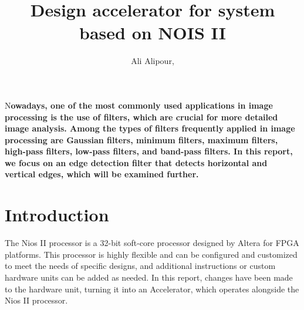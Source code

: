 \documentclass[DIV=calc, paper=a4, fontsize=11pt, twocolumn]{scrartcl}	 %
\title{Design accelerator for system based on NOIS II} %
\author{Ali Alipour, } %
\date{} %
\newcommand{\initial}[1]{ %
\lettrine[lines=3,lhang=0.3,nindent=0em]{
\color{DarkGoldenrod}
{\textsf{#1}}}{}}
\begin{document}
\maketitle %

\thispagestyle{fancy} %


\initial{N}\textbf{owadays, one of the most commonly used applications in image processing is 
the use of filters, which are crucial for more detailed image analysis. Among the types of filters 
frequently applied in image processing are Gaussian filters, minimum filters, maximum filters, high-pass 
filters, low-pass filters, and band-pass filters. In this report, we focus on an edge detection filter that 
detects horizontal and vertical edges, which will be examined further.}


\section*{\small{Introduction}}


The Nios II processor is a 32-bit soft-core processor designed by Altera for FPGA platforms. 
This processor is highly flexible and can be configured and customized to meet the needs of 
specific designs, and additional instructions or custom hardware units can be added as needed. 
In this report, changes have been made to the hardware unit, turning it into an Accelerator, 
which operates alongside the Nios II processor.



\end{document}
